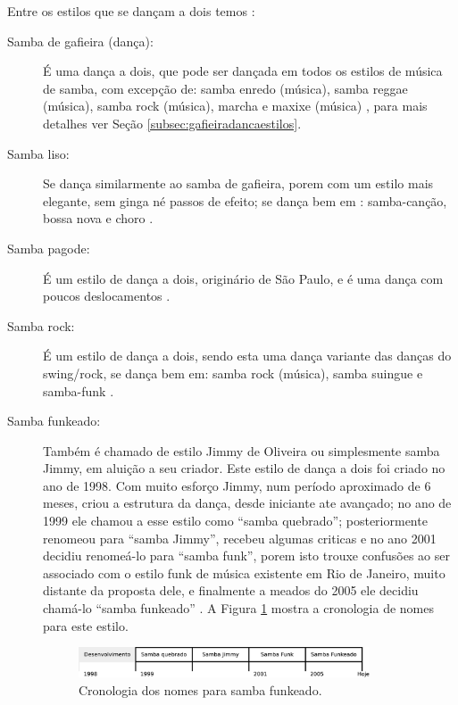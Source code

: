 Entre os estilos que se dançam a dois temos \cite[pp. 134]{perna2002samba}:
\begin{description}
\item[Samba de gafieira (dança):] É uma dança a dois, que pode ser dançada em todos os estilos de música de samba,
com excepção de: samba enredo (música), samba reggae (música), samba rock (música), marcha e maxixe (música) \cite[pp. 134]{perna2002samba}, para mais detalhes ver Seção \ref{subsec:gafieiradancaestilos}.

\item[Samba liso:] Se dança similarmente ao samba de gafieira, 
porem com um estilo mais elegante, sem ginga né passos de efeito;
se dança bem em : samba-canção, bossa nova e choro \cite[pp. 134]{perna2002samba}.

\item[Samba pagode:] É um estilo de dança a dois, originário de São Paulo, 
e é uma dança com poucos deslocamentos \cite[pp. 134]{perna2002samba}.

\item[Samba rock:] É um estilo de dança a dois, sendo esta uma dança variante das danças do swing/rock,
se dança bem em: samba rock (música), samba suingue e samba-funk \cite[pp. 135, 138]{perna2002samba}.

\item[Samba funkeado:] Também é chamado de estilo Jimmy de Oliveira ou simplesmente  samba Jimmy, 
em aluição a seu criador.
Este estilo de dança a dois foi criado no ano de 1998.
Com muito esforço Jimmy, num período aproximado de 6 meses, 
criou a estrutura da dança, desde iniciante ate avançado;
no ano de 1999 ele  chamou a esse estilo como ``samba quebrado'';  
posteriormente renomeou  para ``samba Jimmy'', 
recebeu algumas criticas e no ano 2001 decidiu renomeá-lo para ``samba funk'',
porem isto trouxe confusões   ao ser associado com o estilo funk de música existente em Rio de Janeiro,
muito distante da proposta dele, e
finalmente a meados do 2005 ele decidiu chamá-lo ``samba funkeado''  \cite{sambafunkeadoJimmyDeOliveiraPart1}.
A Figura \ref{fig:funkeadocrono1} mostra a cronologia de nomes para este estilo.
\begin{figure}[h]
  \centering
    \includegraphics[width=0.85\textwidth]{chapters/cap-historia-musicasamba/sambafunkeado.eps}
  \caption{Cronologia dos nomes para samba funkeado.}
\label{fig:funkeadocrono1}
\end{figure}


\end{description}
